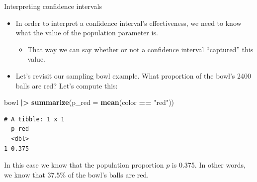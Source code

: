 \documentclass[
  ignorenonframetext,
]{beamer}
\newenvironment{Shaded}{\begin{snugshade}}{\end{snugshade}}
\newcommand{\AttributeTok}[1]{\textcolor[rgb]{0.13,0.29,0.53}{#1}}
\newcommand{\FunctionTok}[1]{\textcolor[rgb]{0.13,0.29,0.53}{\textbf{#1}}}
\newcommand{\NormalTok}[1]{#1}
\newcommand{\SpecialCharTok}[1]{\textcolor[rgb]{0.81,0.36,0.00}{\textbf{#1}}}
\newcommand{\StringTok}[1]{\textcolor[rgb]{0.31,0.60,0.02}{#1}}
\providecommand{\tightlist}{%
  \setlength{\itemsep}{0pt}\setlength{\parskip}{0pt}}
\begin{document}
\begin{frame}[fragile]{Interpreting confidence intervals}
\protect\hypertarget{interpreting-confidence-intervals-2}{}
\begin{itemize}
\item
  In order to interpret a confidence interval's effectiveness, we need
  to know what the value of the population parameter is.

  \begin{itemize}
  \tightlist
  \item
    That way we can say whether or not a confidence interval
    ``captured'' this value.
  \end{itemize}
\item
  Let's revisit our sampling bowl example. What proportion of the bowl's
  2400 balls are red? Let's compute this:
\end{itemize}

\begin{Shaded}
\begin{Highlighting}[]
\NormalTok{bowl }\SpecialCharTok{|\textgreater{}} \FunctionTok{summarize}\NormalTok{(}\AttributeTok{p\_red =} \FunctionTok{mean}\NormalTok{(color }\SpecialCharTok{==} \StringTok{"red"}\NormalTok{))}
\end{Highlighting}
\end{Shaded}

\begin{verbatim}
# A tibble: 1 x 1
  p_red
  <dbl>
1 0.375
\end{verbatim}

In this case we know that the population proportion \(p\) is 0.375. In
other words, we know that \(37.5\%\) of the bowl's balls are red.
\end{frame}
\end{document}
